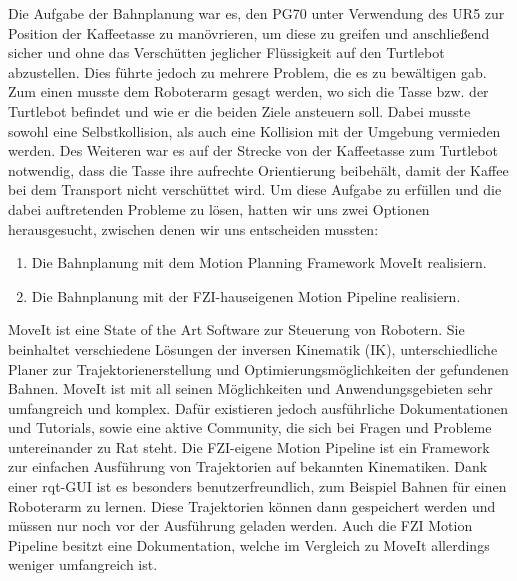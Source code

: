 Die Aufgabe der Bahnplanung war es, den PG70 unter Verwendung des UR5 zur Position der Kaffeetasse zu manövrieren, um diese zu greifen und anschließend sicher und ohne das Verschütten jeglicher Flüssigkeit auf den Turtlebot abzustellen. Dies führte jedoch zu mehrere Problem, die es zu bewältigen gab.
\newline
Zum einen musste dem Roboterarm gesagt werden, wo sich die Tasse bzw. der Turtlebot befindet und wie er die beiden Ziele ansteuern soll. Dabei musste sowohl eine Selbstkollision, als auch eine Kollision mit der Umgebung vermieden werden. Des Weiteren war es auf der Strecke von der Kaffeetasse zum Turtlebot notwendig, dass die Tasse ihre aufrechte Orientierung beibehält, damit der Kaffee bei dem Transport nicht verschüttet wird.
\newline
Um diese Aufgabe zu erfüllen und die dabei auftretenden Probleme zu lösen, hatten wir uns zwei Optionen herausgesucht, zwischen denen wir uns entscheiden mussten:
\begin{enumerate}
	\item Die Bahnplanung mit dem Motion Planning Framework MoveIt \cite{MoveIt} realisiern.
	\item Die Bahnplanung mit der FZI-hauseigenen Motion Pipeline \cite{FZIPipeline} realisiern.
\end{enumerate}
MoveIt ist eine State of the Art Software zur Steuerung von Robotern. Sie beinhaltet verschiedene Lösungen der inversen Kinematik (IK), unterschiedliche Planer zur Trajektorienerstellung und Optimierungsmöglichkeiten der gefundenen Bahnen. MoveIt ist mit all seinen Möglichkeiten und Anwendungsgebieten sehr umfangreich und komplex. Dafür existieren jedoch ausführliche Dokumentationen und Tutorials, sowie eine aktive Community, die sich bei Fragen und Probleme untereinander zu Rat steht.
\newline
Die FZI-eigene Motion Pipeline ist ein Framework zur einfachen Ausführung von Trajektorien auf bekannten Kinematiken. Dank einer rqt-GUI ist es besonders benutzerfreundlich, zum Beispiel Bahnen für einen Roboterarm zu lernen. Diese Trajektorien können dann gespeichert werden und müssen nur noch vor der Ausführung geladen werden. Auch die FZI Motion Pipeline besitzt eine Dokumentation, welche im Vergleich zu MoveIt allerdings weniger umfangreich ist.
